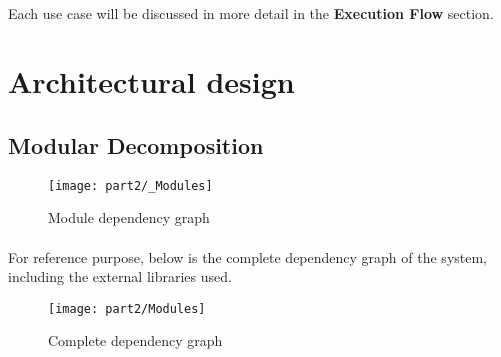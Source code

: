 \documentclass[../gr-final.tex]{subfiles}
\begin{document}
\paragraph{} Each use case will be discussed in more detail in
the {\bfseries Execution Flow} section.


\section{Architectural design}
\subsection{Modular Decomposition}
\begin{figure}[H]
\texttt{[image: part2/\_Modules]}
\caption{Module dependency graph}
\end{figure}
\paragraph{}For reference purpose, below is the complete dependency
graph of the system, including the external libraries used.
\begin{figure}[H]
\texttt{[image: part2/Modules]}
\caption{Complete dependency graph}
\end{figure}
\end{document}
